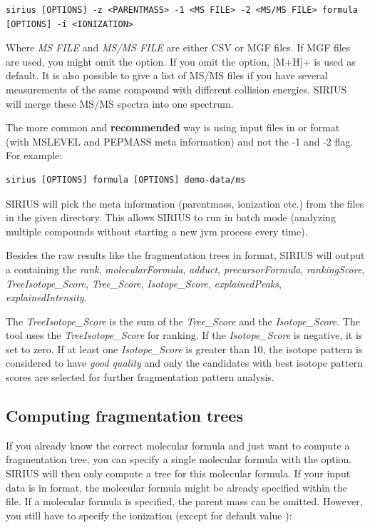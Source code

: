 \documentclass[letterpaper,10pt,openany,oneside]{sphinxmanual}
\newcommand\gui[1]{\textsl{\guilsinglleft#1\guilsinglright\xspace}}
\begin{document}
\begin{Verbatim}[commandchars=\\\{\}]
sirius [OPTIONS] -z <PARENTMASS> -1 <MS FILE> -2 <MS/MS FILE> formula [OPTIONS] -i <IONIZATION> 
\end{Verbatim}

Where \gui{MS FILE} and \gui{MS/MS FILE} are either CSV or MGF files. If MGF files are used, you might omit the  option. If you omit the  option, {[}M+H{]}+ is used as default. It is also possible to give a list of MS/MS files if you have several measurements of the same compound with different collision energies. SIRIUS will merge these MS/MS spectra into one spectrum. 

The more common and \textbf{recommended} way is using input files in  or  format (with MSLEVEL and PEPMASS meta information) and not the -1 and -2 flag. For example:

\begin{Verbatim}[commandchars=\\\{\}]
sirius [OPTIONS] formula [OPTIONS] demo-data/ms
\end{Verbatim}

SIRIUS will pick the meta information (parentmass, ionization etc.) from the  files in the given directory. This allows SIRIUS to run in batch mode (analyzing multiple compounds without starting a new jvm process every time).

Besides the raw results like the fragmentation trees in  format, SIRIUS will output a   containing the  
\gui{rank},	\gui{molecularFormula},	\gui{adduct}, \gui{precursorFormula},	\gui{rankingScore},	\gui{TreeIsotope\_Score},	\gui{Tree\_Score},	\gui{Isotope\_Score},	\gui{explainedPeaks},	\gui{explainedIntensity}.

The \gui{TreeIsotope\_Score} is the sum of the \gui{Tree\_Score} and the \gui{Isotope\_Score}. The  tool uses the \gui{TreeIsotope\_Score} for ranking. If the \gui{Isotope\_Score} is negative, it is set to zero. If at least one \gui{Isotope\_Score} is greater than 10, the isotope pattern is considered to have \emph{good quality} and only the candidates with best isotope pattern scores are selected for further fragmentation pattern analysis.


\subsection*{Computing fragmentation trees}
\label{commandline:computing-fragmentation-trees}
If you already know the correct molecular formula and just want to compute a
fragmentation tree, you can specify a single molecular formula with
the  option. SIRIUS will then only compute a tree for this
molecular formula. If your input data is in  format, the molecular
formula might be already specified within the file. If a molecular formula is
specified, the parent mass can be omitted. However, you still have to specify
the ionization (except for default value \code{{[}M+H{]}+}):
\end{document}
